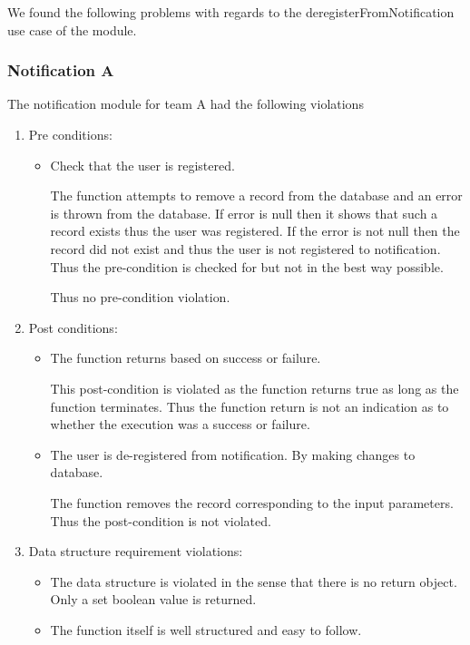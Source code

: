 
We found the following problems with regards to the deregisterFromNotification use case of the module.
\subsubsection*{Notification A}
The notification module for team A had the following violations
\begin{enumerate}
	\item Pre conditions:
	\begin{itemize}
		\item Check that the user is registered.
		
		 The function attempts to remove a record from the database and an error is thrown from the database. If error is null then it shows that such a record exists thus the user was registered. If the error is not null then the record did not exist and thus the user is not registered to notification. Thus the pre-condition is checked for but not in the best way possible. 
		 
		 Thus no pre-condition violation.
	\end{itemize}
	\item Post conditions:
	\begin{itemize}
		\item The function returns based on success or failure.
		
		This post-condition is violated as the function returns true as long as the function terminates. Thus the function return is not an indication as to whether the execution was a success or failure.
		
		\item The user is de-registered from notification. By making changes to database.
		
		The function removes the record corresponding to the input parameters. Thus the post-condition is not violated.	
		
		
	\end{itemize}
	\item Data structure requirement violations:
	\begin{itemize}
		\item 		The data structure is violated in the sense that there is no return object. Only a set boolean value is returned.
		\item	The function itself is well structured and easy to follow.

	\end{itemize}
\end{enumerate}
